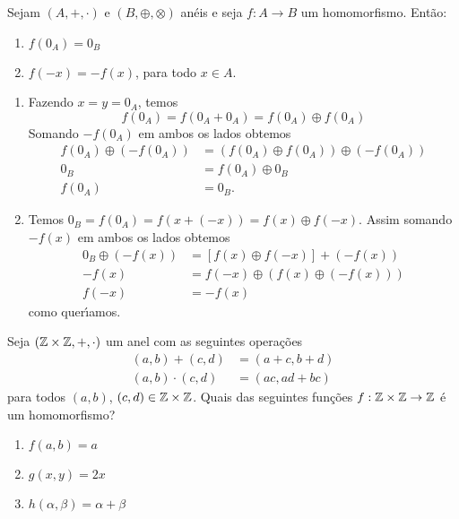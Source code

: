 \begin{proposicao}
	Sejam $(A, +, \cdot)$ e $(B, \oplus, \otimes)$ an\'eis e seja $f : A \to B$ um homomorfismo. Ent{\~a}o:
	\begin{enumerate}[label={\roman*})]
		\item $f(0_{A}) = 0_{B}$
		\item $f(-x) = -f(x)$, para todo $x \in A$.
	\end{enumerate}
\end{proposicao}
\begin{prova}
	\begin{enumerate}[label={\roman*})]
		\item Fazendo $x = y = 0_{A}$, temos
		\[
			f(0_A) = f(0_A + 0_A) = f(0_A) \oplus f(0_A)
		\]
		Somando $-f(0_A)$ em ambos os lados obtemos
		\begin{align*}
			f(0_A) \oplus (-f(0_A)) &= (f(0_A)\oplus f(0_A)) \oplus (-f(0_A))\\
			0_B &= f(0_A) \oplus 0_B\\
			f(0_A) &= 0_B.
		\end{align*}

		\item Temos $0_B = f(0_A) = f(x + (-x)) = f(x)\oplus f(-x)$. Assim somando $-f(x)$ em ambos os lados obtemos
		\begin{align*}
			0_B\oplus(-f(x)) &= [f(x)\oplus f(-x)] + (-f(x))\\
			-f(x) &= f(-x) \oplus (f(x) \oplus (-f(x)))\\
			f(-x) &= -f(x)
		\end{align*}
		como quer{\'\i}amos.
	\end{enumerate}
\end{prova}

\begin{exemplo}
    Seja $(\mathbb{Z}\times\mathbb{Z}, +, \cdot)$ um anel com as seguintes opera\c{c}\~oes
    \begin{align*}
        (a, b) + (c, d) &= (a + c, b + d)\\
        (a, b)\cdot (c, d) &= (ac, ad + bc)
    \end{align*}
    para todos $(a, b)$, $(c, d) \in \mathbb{Z}\times\mathbb{Z}$.
    Quais das seguintes funções $f : \mathbb{Z}\times\mathbb{Z} \to \mathbb{Z}$ \'e um homomorfismo?
    \begin{enumerate}[label={\roman*})]
        \item $f(a, b) = a$

        \item $g(x, y) = 2x$

        \item $h(\alpha, \beta)= \alpha + \beta$
    \end{enumerate}
\end{exemplo}


